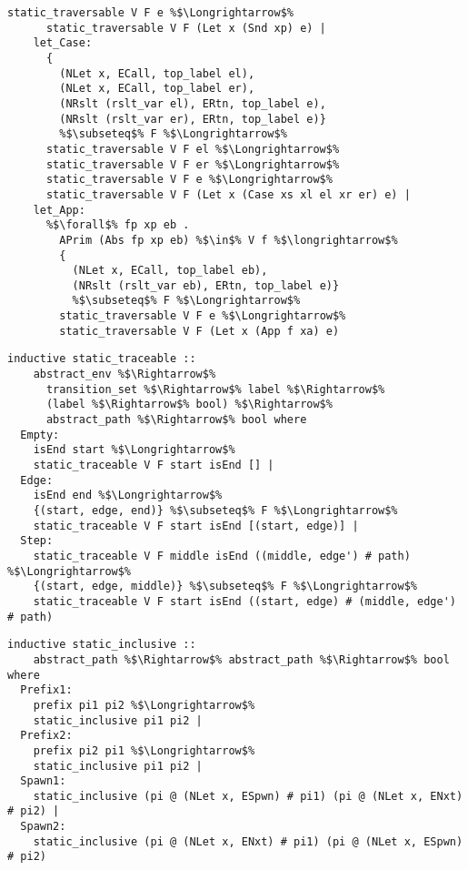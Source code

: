 \documentclass{article}
\begin{document}
\begin{lstlisting}[style=codestyle1, escapechar=\%]
      static_traversable V F e %$\Longrightarrow$%
      static_traversable V F (Let x (Snd xp) e) |
    let_Case:
      {
        (NLet x, ECall, top_label el),
        (NLet x, ECall, top_label er),
        (NRslt (rslt_var el), ERtn, top_label e),
        (NRslt (rslt_var er), ERtn, top_label e)}
        %$\subseteq$% F %$\Longrightarrow$%
      static_traversable V F el %$\Longrightarrow$%
      static_traversable V F er %$\Longrightarrow$%
      static_traversable V F e %$\Longrightarrow$%
      static_traversable V F (Let x (Case xs xl el xr er) e) |
    let_App:
      %$\forall$% fp xp eb .
        APrim (Abs fp xp eb) %$\in$% V f %$\longrightarrow$%
        {
          (NLet x, ECall, top_label eb),
          (NRslt (rslt_var eb), ERtn, top_label e)}
          %$\subseteq$% F %$\Longrightarrow$%
        static_traversable V F e %$\Longrightarrow$%
        static_traversable V F (Let x (App f xa) e)

  \end{lstlisting}

\begin{lstlisting}[style=codestyle1, escapechar=\%]
  inductive static_traceable ::
    abstract_env %$\Rightarrow$%
      transition_set %$\Rightarrow$% label %$\Rightarrow$%
      (label %$\Rightarrow$% bool) %$\Rightarrow$%
      abstract_path %$\Rightarrow$% bool where
  Empty:
    isEnd start %$\Longrightarrow$%
    static_traceable V F start isEnd [] |
  Edge:
    isEnd end %$\Longrightarrow$%
    {(start, edge, end)} %$\subseteq$% F %$\Longrightarrow$%
    static_traceable V F start isEnd [(start, edge)] |
  Step:
    static_traceable V F middle isEnd ((middle, edge') # path) %$\Longrightarrow$%
    {(start, edge, middle)} %$\subseteq$% F %$\Longrightarrow$%
    static_traceable V F start isEnd ((start, edge) # (middle, edge') # path)
  \end{lstlisting}

\begin{lstlisting}[style=codestyle1, escapechar=\%]
  inductive static_inclusive ::
    abstract_path %$\Rightarrow$% abstract_path %$\Rightarrow$% bool where
  Prefix1:
    prefix pi1 pi2 %$\Longrightarrow$%
    static_inclusive pi1 pi2 |
  Prefix2:
    prefix pi2 pi1 %$\Longrightarrow$%
    static_inclusive pi1 pi2 |
  Spawn1:
    static_inclusive (pi @ (NLet x, ESpwn) # pi1) (pi @ (NLet x, ENxt) # pi2) |
  Spawn2:
    static_inclusive (pi @ (NLet x, ENxt) # pi1) (pi @ (NLet x, ESpwn) # pi2)
  \end{lstlisting}
\end{document}
